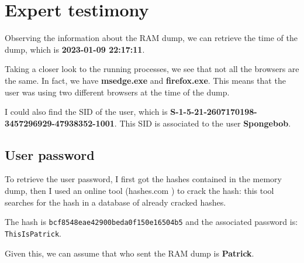 \documentclass[12pt]{article}
\begin{document}
\section{Expert testimony}

Observing the information about the RAM dump, we can retrieve the time of the dump, which is \textbf{2023-01-09 22:17:11}.

Taking a closer look to the running processes, we see that not all the browsers are the same. In fact, we have \textbf{msedge.exe} and \textbf{firefox.exe}. This means that the user was using two different browsers at the time of the dump.

I could also find the SID of the user, which is \textbf{S-1-5-21-2607170198-3457296929-47938352-1001}. This SID is associated to the user \textbf{Spongebob}.

\subsection{User password}

To retrieve the user password, I first got the hashes contained in the memory dump, then I used an online tool (hashes.com \cite{hashes}) to crack the hash: this tool searches for the hash in a database of already cracked hashes.

The hash is \texttt{bcf8548eae42900beda0f150e16504b5} and the associated password is: \\\texttt{ThisIsPatrick}.

Given this, we can assume that who sent the RAM dump is \textbf{Patrick}.

\printbibliography[title={References}]
\end{document}
